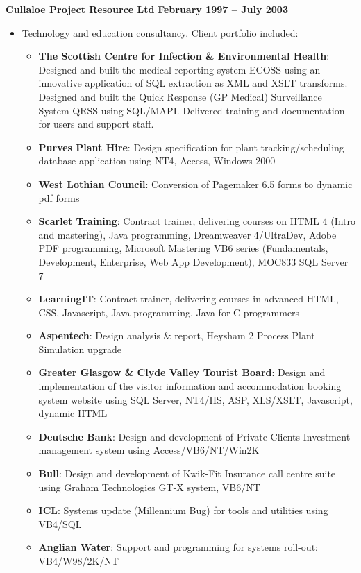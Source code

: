 \documentclass[10pt]{article}
\newenvironment{outerlist}[1][\enskip\textbullet]%
        {\begin{itemize}[#1]}{\end{itemize}%
         \vspace{-.6\baselineskip}}
\newcommand{\blankline}{\quad\pagebreak[2]}
\begin{document}
\blankline

\textbf{Cullaloe Project Resource Ltd}        \hfill \textbf{February 1997 -- July 2003}

\begin{outerlist}
\item[] Technology and education consultancy. Client portfolio included:

\begin{outerlist}

\item \textbf{The Scottish Centre for Infection \& Environmental Health}:		Designed and built the medical reporting system ECOSS using an innovative application of SQL extraction as XML and XSLT transforms. Designed and built the Quick Response (GP Medical) Surveillance System QRSS using SQL/MAPI. Delivered training and documentation for users and support staff.
\item \textbf{Purves Plant Hire}: Design specification for plant tracking/scheduling database application using NT4, Access, Windows 2000
\item \textbf{West Lothian Council}: Conversion of Pagemaker 6.5 forms to dynamic pdf forms
\item \textbf{Scarlet Training}: Contract trainer, delivering courses on HTML 4 (Intro and mastering), Java programming, Dreamweaver 4/UltraDev, Adobe PDF programming, Microsoft Mastering VB6 series (Fundamentals, Development, Enterprise, Web App Development), MOC833 SQL Server 7
\item \textbf{LearningIT}: Contract trainer, delivering courses in advanced HTML, CSS, Javascript, Java programming, Java for C programmers
\item \textbf{Aspentech}: Design analysis \& report, Heysham 2 Process Plant Simulation upgrade
\item \textbf{Greater Glasgow \& Clyde Valley Tourist Board}: Design and implementation of the visitor information and accommodation booking system website using SQL Server, NT4/IIS, ASP, XLS/XSLT, Javascript, dynamic HTML
\item \textbf{Deutsche Bank}:	Design and development of Private Clients Investment management system using Access/VB6/NT/Win2K
\item \textbf{Bull}: Design and development of Kwik-Fit Insurance call centre suite using Graham Technologies GT-X system, VB6/NT
\item \textbf{ICL}: Systems update (Millennium Bug) for tools and utilities using VB4/SQL
\item \textbf{Anglian Water}: Support and programming for systems roll-out: VB4/W98/2K/NT

\end{outerlist}
\end{outerlist}
\end{document}
